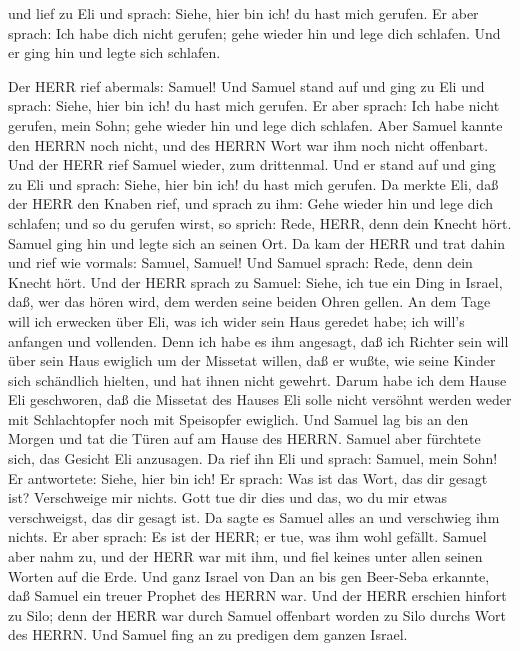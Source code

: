  und lief zu Eli und sprach: Siehe, hier bin ich! du hast
mich gerufen. Er aber sprach: Ich habe dich nicht gerufen; gehe wieder
hin und lege dich schlafen. Und er ging hin und legte sich schlafen.

 Der HERR rief abermals: Samuel! Und Samuel stand auf und
ging zu Eli und sprach: Siehe, hier bin ich! du hast mich gerufen. Er
aber sprach: Ich habe nicht gerufen, mein Sohn; gehe wieder hin und lege
dich schlafen.  Aber Samuel kannte den HERRN noch nicht, und
des HERRN Wort war ihm noch nicht offenbart.  Und der HERR
rief Samuel wieder, zum drittenmal. Und er stand auf und ging zu Eli und
sprach: Siehe, hier bin ich! du hast mich gerufen. Da merkte Eli, daß
der HERR den Knaben rief,  und sprach zu ihm: Gehe wieder
hin und lege dich schlafen; und so du gerufen wirst, so sprich: Rede,
HERR, denn dein Knecht hört. Samuel ging hin und legte sich an seinen
Ort.  Da kam der HERR und trat dahin und rief wie vormals:
Samuel, Samuel! Und Samuel sprach: Rede, denn dein Knecht hört.
 Und der HERR sprach zu Samuel: Siehe, ich tue ein Ding in
Israel, daß, wer das hören wird, dem werden seine beiden Ohren gellen.
 An dem Tage will ich erwecken über Eli, was ich wider sein
Haus geredet habe; ich will's anfangen und vollenden.  Denn
ich habe es ihm angesagt, daß ich Richter sein will über sein Haus
ewiglich um der Missetat willen, daß er wußte, wie seine Kinder sich
schändlich hielten, und hat ihnen nicht gewehrt.  Darum
habe ich dem Hause Eli geschworen, daß die Missetat des Hauses Eli solle
nicht versöhnt werden weder mit Schlachtopfer noch mit Speisopfer
ewiglich.  Und Samuel lag bis an den Morgen und tat die
Türen auf am Hause des HERRN. Samuel aber fürchtete sich, das Gesicht
Eli anzusagen.  Da rief ihn Eli und sprach: Samuel, mein
Sohn! Er antwortete: Siehe, hier bin ich!  Er sprach: Was
ist das Wort, das dir gesagt ist? Verschweige mir nichts. Gott tue dir
dies und das, wo du mir etwas verschweigst, das dir gesagt ist.
 Da sagte es Samuel alles an und verschwieg ihm nichts. Er
aber sprach: Es ist der HERR; er tue, was ihm wohl gefällt.
 Samuel aber nahm zu, und der HERR war mit ihm, und fiel
keines unter allen seinen Worten auf die Erde.  Und ganz
Israel von Dan an bis gen Beer-Seba erkannte, daß Samuel ein treuer
Prophet des HERRN war.  Und der HERR erschien hinfort zu
Silo; denn der HERR war durch Samuel offenbart worden zu Silo durchs
Wort des HERRN. Und Samuel fing an zu predigen dem ganzen Israel.

